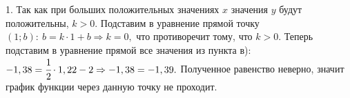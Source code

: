 1. Так как при больших положительных значениях $x$ значения $y$ будут положительны, $k>0.$ Подставим в уравнение прямой точку $(1;b):\ b=k\cdot1+b \Rightarrow k=0,$ что противоречит тому, что $k>0.$ Теперь подставим в уравнение прямой все значения из пункта в): $-1,38=\cfrac{1}{2}\cdot1,22-2\Rightarrow-1,38=-1,39.$ Полученное равенство неверно, значит график функции через данную точку не проходит.\\
